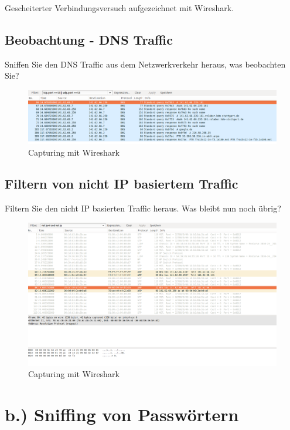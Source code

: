 \documentclass[a4paper]{report}
\begin{document}
Gescheiterter Verbindungsversuch aufgezeichnet mit Wireshark.

\newpage
\subsection{Beobachtung - DNS Traffic}
Sniffen Sie den DNS Traffic aus dem Netzwerkverkehr heraus, was beobachten Sie?

\begin{figure}[htb]
	\centering
		\includegraphics[width=1.25\textwidth]{laborergebnisse/screenshots/a_3.png}
	\caption{Capturing mit Wireshark}
	\label{fig:capturingwireshark1}
\end{figure}

\newpage
\subsection{Filtern von nicht IP basiertem Traffic}
Filtern Sie den nicht IP basierten Traffic heraus. Was bleibt nun noch übrig?

\begin{figure}[htb]
	\centering
		\includegraphics[width=1.25\textwidth]{laborergebnisse/screenshots/a_4.png}
	\caption{Capturing mit Wireshark}
	\label{fig:capturingwireshark1}
\end{figure}

\newpage

\section{b.) Sniffing von Passwörtern}
\end{document}
